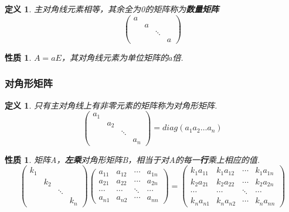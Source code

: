 \documentclass[12pt, a4paper, oneside]{ctexbook}
\newtheorem{definition}[theorem]{定义}
\newtheorem{quolity}[theorem]{性质}
\begin{document}
\begin{definition}
    主对角线元素相等，其余全为0的矩阵称为\textbf{数量矩阵}
    $$\left ( \begin{matrix}
        a &   &   & \\
          & a &   & \\
          &   & \ddots & \\
          &   &   & a
    \end{matrix} \right )$$
\end{definition}

\begin{quolity}
    $A = aE$，其对角线元素为单位矩阵的$a$倍. 
\end{quolity}

\subsubsection{对角形矩阵}

\begin{definition}
    只有主对角线上有非零元素的矩阵称为对角形矩阵. 
    $$\left ( \begin{matrix}
        a_1 &   &   & \\
          & a_2 &   & \\
          &   & \ddots & \\
          &   &   & a_n
    \end{matrix} \right ) = diag(a_1 a_2 \dots a_n)$$
\end{definition}

\begin{quolity}
    矩阵A，\textbf{左乘}对角形矩阵B，相当于对A的每一\textbf{行}乘上相应的值. 
    $$\left ( \begin{matrix}
        k_1 &   &   & \\
          & k_2 &   & \\
          &   & \ddots & \\
          &   &   & k_n
    \end{matrix} \right ) \left ( \begin{matrix}
        a_{11} & a_{12} & \cdots & a_{1n} \\
        a_{21} & a_{22} & \cdots & a_{2n} \\
        \cdots & \cdots & \ddots & \cdots \\
        a_{n1} & a_{n2} & \cdots & a_{nn}
    \end{matrix} \right ) = \left ( \begin{matrix}
        k_1a_{11} & k_1a_{12} & \cdots & k_1a_{1n} \\
        k_2a_{21} & k_2a_{22} & \cdots & k_2a_{2n} \\
        \cdots & \cdots & \ddots & \cdots \\
        k_na_{n1} & k_na_{n2} & \cdots & k_na_{nn}
    \end{matrix} \right )$$
\end{quolity}
\end{document}
